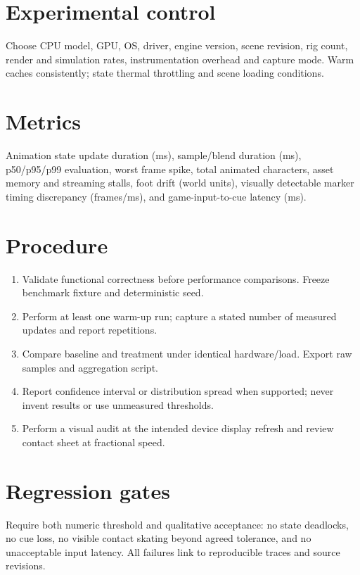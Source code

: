 \documentclass[10pt,letterpaper]{article}
\begin{document}
\makedoctitle
\makedocsummary
\tableofcontents\clearpage

\section{Experimental control}
Choose CPU model, GPU, OS, driver, engine version, scene revision, rig count, render and simulation rates, instrumentation overhead and capture mode. Warm caches consistently; state thermal throttling and scene loading conditions.
\section{Metrics}
Animation state update duration (ms), sample/blend duration (ms), p50/p95/p99 evaluation, worst frame spike, total animated characters, asset memory and streaming stalls, foot drift (world units), visually detectable marker timing discrepancy (frames/ms), and game-input-to-cue latency (ms).
\section{Procedure}
\begin{enumerate}
\item Validate functional correctness before performance comparisons. Freeze benchmark fixture and deterministic seed.
\item Perform at least one warm-up run; capture a stated number of measured updates and report repetitions.
\item Compare baseline and treatment under identical hardware/load. Export raw samples and aggregation script.
\item Report confidence interval or distribution spread when supported; never invent results or use unmeasured thresholds.
\item Perform a visual audit at the intended device display refresh and review contact sheet at fractional speed.
\end{enumerate}
\section{Regression gates}
Require both numeric threshold and qualitative acceptance: no state deadlocks, no cue loss, no visible contact skating beyond agreed tolerance, and no unacceptable input latency. All failures link to reproducible traces and source revisions.
\end{document}
